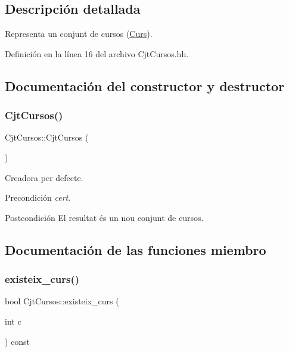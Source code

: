 \subsection{Descripción detallada}
Representa un conjunt de cursos (\mbox{\hyperlink{class_curs}{Curs}}). 

Definición en la línea 16 del archivo Cjt\+Cursos.\+hh.



\subsection{Documentación del constructor y destructor}
\mbox{\label{class_cjt_cursos_a0d8729229189d748a8c62033277268ba}} 
\subsubsection{\texorpdfstring{Cjt\+Cursos()}{CjtCursos()}}
{\footnotesize\ttfamily Cjt\+Cursos\+::\+Cjt\+Cursos (\begin{DoxyParamCaption}{ }\end{DoxyParamCaption})}



Creadora per defecte. 

\begin{DoxyPrecond}{Precondición}
{\itshape cert}. 
\end{DoxyPrecond}
\begin{DoxyPostcond}{Postcondición}
El resultat és un nou conjunt de cursos. 
\end{DoxyPostcond}


\subsection{Documentación de las funciones miembro}
\mbox{\label{class_cjt_cursos_ad12b1174de2a5f09cb0c2558645d74dc}} 
\subsubsection{\texorpdfstring{existeix\+\_\+curs()}{existeix\_curs()}}
{\footnotesize\ttfamily bool Cjt\+Cursos\+::existeix\+\_\+curs (\begin{DoxyParamCaption}\item[{int}]{c }\end{DoxyParamCaption}) const}




